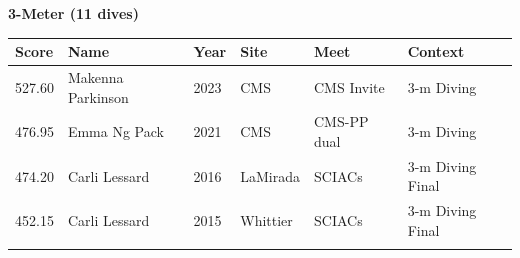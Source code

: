 \vspace{1.2em}
\noindent\begin{minipage}[t]{0.98\textwidth}
\centering
\textbf{\textcolor{teamprimary}{3-Meter (11 dives)}}\par
\vspace{0.5em}
\centering
\small
\renewcommand{\arraystretch}{1.0}
\setlength{\tabcolsep}{4pt}
\begin{tabular}{@{}p{2.0cm}p{3.2cm}p{1.2cm}p{2.0cm}p{2.0cm}p{2.5cm}@{}}
\toprule
\textbf{Score} & \textbf{Name} & \textbf{Year} & \textbf{Site} & \textbf{Meet} & \textbf{Context} \\
\midrule
527.60 & Makenna Parkinson & 2023 & CMS & CMS Invite & 3-m Diving \\
476.95 & Emma Ng Pack & 2021 & CMS & CMS-PP dual & 3-m Diving \\
474.20 & Carli Lessard & 2016 & LaMirada & SCIACs & 3-m Diving Final \\
452.15 & Carli Lessard & 2015 & Whittier & SCIACs & 3-m Diving Final \\
\bottomrule
\vspace{0.5em}
\end{tabular}
\end{minipage}
\vspace{1.2em}
